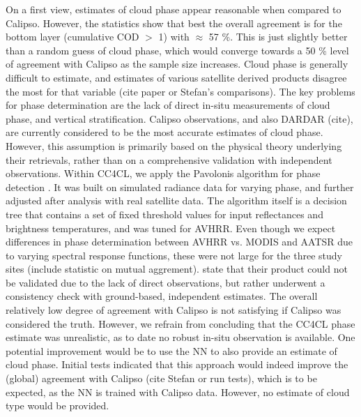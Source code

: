 On a first view, estimates of cloud phase appear reasonable when compared to Calipso. However, the statistics show that best the overall agreement is for the bottom layer (cumulative COD $>$ 1) with $\approx$ 57 \%. This is just slightly better than a random guess of cloud phase, which would converge towards a 50 \% level of agreement with Calipso as the sample size increases. Cloud phase is generally difficult to estimate, and estimates of various satellite derived products disagree the most for that variable (cite paper or Stefan's comparisons). The key problems for phase determination are the lack of direct in-situ measurements of cloud phase, and vertical stratification. Calipso observations, and also DARDAR (cite), are currently considered to be the most accurate estimates of cloud phase. However, this assumption is primarily based on the physical theory underlying their retrievals, rather than on a comprehensive validation with independent observations. Within CC4CL, we apply the Pavolonis algorithm for phase detection \citep{Pavolonis05}. It was built on simulated radiance data for varying phase, and further adjusted after analysis with real satellite data. The algorithm itself is a decision tree that contains a set of fixed threshold values for input reflectances and brightness temperatures, and was tuned for AVHRR. Even though we expect differences in phase determination between AVHRR vs. MODIS and AATSR due to varying spectral response functions, these were not large for the three study sites (include statistic on mutual aggrement). \citet{Pavolonis05} state that their product could not be validated due to the lack of direct observations, but rather underwent a consistency check with ground-based, independent estimates. The overall relatively low degree of agreement with Calipso is not satisfying if Calipso was considered the truth. However, we refrain from concluding that the CC4CL phase estimate was unrealistic, as to date no robust in-situ observation is available. One potential improvement would be to use the NN to also provide an estimate of cloud phase. Initial tests indicated that this approach would indeed improve the (global) agreement with Calipso (cite Stefan or run tests), which is to be expected, as the NN is trained with Calipso data. However, no estimate of cloud type would be provided.





